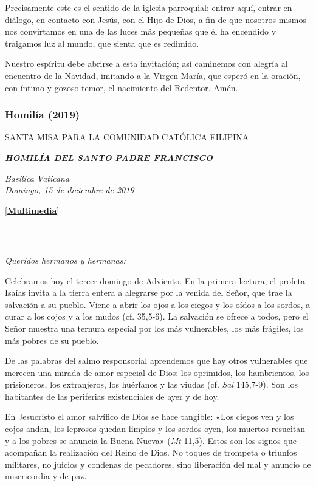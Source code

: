 Precisamente este es el sentido de la iglesia parroquial: entrar aquí,
entrar en diálogo, en contacto con Jesús, con el Hijo de Dios, a fin de
que nosotros mismos nos convirtamos en una de las luces más pequeñas que
él ha encendido y traigamos luz al mundo, que sienta que es redimido.

Nuestro espíritu debe abrirse a esta invitación; así caminemos con
alegría al encuentro de la Navidad, imitando a la Virgen María, que
esperó en la oración, con íntimo y gozoso temor, el nacimiento del
Redentor. Amén.

\subsubsection{Homilía (2019)}
SANTA MISA PARA LA COMUNIDAD CATÓLICA FILIPINA

\textbf{\emph{HOMILÍA DEL SANTO PADRE FRANCISCO}}

\emph{Basílica Vaticana\\
	Domingo, 15 de diciembre de 2019}

{[}\textbf{\href{http://w2.vatican.va/content/francesco/es/events/event.dir.html/content/vaticanevents/es/2019/12/15/messa-comunita-filippina.html}{Multimedia}}{]}

\begin{center}\rule{0.5\linewidth}{\linethickness}\end{center}

~

\emph{Queridos hermanos y hermanas:}

Celebramos hoy el tercer domingo de Adviento. En la primera lectura, el
profeta Isaías invita a la tierra entera a alegrarse por la venida del
Señor, que trae la salvación a su pueblo. Viene a abrir los ojos a los
ciegos y los oídos a los sordos, a curar a los cojos y a los mudos (cf.
35,5-6). La salvación se ofrece a todos, pero el Señor muestra una
ternura especial por los más vulnerables, los más frágiles, los más
pobres de su pueblo.

De las palabras del salmo responsorial aprendemos que hay otros
vulnerables que merecen una mirada de amor especial de Dios: los
oprimidos, los hambrientos, los prisioneros, los extranjeros, los
huérfanos y las viudas (cf. \emph{Sal} 145,7-9). Son los habitantes de
las periferias existenciales de ayer y de hoy.

En Jesucristo el amor salvífico de Dios se hace tangible: «Los ciegos
ven y los cojos andan, los leprosos quedan limpios y los sordos oyen,
los muertos resucitan y a los pobres se anuncia la Buena Nueva»
(\emph{Mt} 11,5). Estos son los signos que acompañan la realización del
Reino de Dios. No toques de trompeta o triunfos militares, no juicios y
condenas de pecadores, sino liberación del mal y anuncio de misericordia
y de paz.

